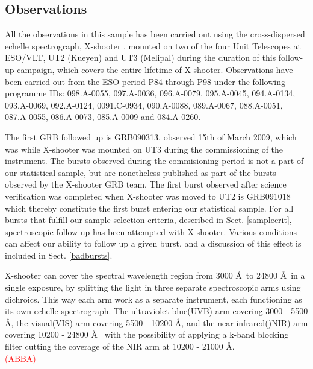 \documentclass{aa}    %
\newcommand\todo[1]{\textcolor{red}{(#1)}}
\begin{document}
\subsection{Observations} \label{obs}

All the observations in this sample has been carried out using the
cross-dispersed echelle spectrograph, X-shooter \citep{Vernet2011}, mounted on
two of the four Unit Telescopes at ESO/VLT, UT2 (Kueyen) and UT3 (Melipal)
during the duration of this follow-up campaign, which covers the entire lifetime
of X-shooter. Observations have been carried out from the ESO period P84
through P98 under the following programme IDs: 098.A-0055, 097.A-0036, 096.A-0079,
095.A-0045, 094.A-0134, 093.A-0069, 092.A-0124, 0091.C-0934, 090.A-0088,
089.A-0067, 088.A-0051, 087.A-0055, 086.A-0073, 085.A-0009 and 084.A-0260. 

The first GRB followed up is GRB090313, observed 15th of March 2009, which was
while X-shooter was mounted on UT3 during the commissioning of the instrument.
The bursts observed during the commisioning period is not a part of our
statistical sample, but are nonetheless published as part of the bursts observed
by the X-shooter GRB team. The first burst observed after science verification
was completed when X-shooter was moved to UT2 is GRB091018 which thereby
constitute the first burst entering our statistical sample. For all bursts that
fulfill our sample selection criteria, described in Sect. \ref{samplecrit},
spectroscopic follow-up has been attempted with X-shooter. Various conditions
can affect our ability to follow up a given burst, and a discussion of this
effect is included in Sect. \ref{badbursts}.

X-shooter can cover the spectral wavelength region from 3000 \AA~to 24800
\AA~in a single exposure, by splitting the light in three separate
spectroscopic arms using dichroics.  This way each arm work as a separate
instrument, each functioning as its own echelle spectrograph.  The ultraviolet
blue(UVB) arm covering 3000 - 5500 \AA, the visual(VIS) arm covering 5500 -
10200 \AA, and the near-infrared()NIR) arm covering 10200 - 24800 \AA~ with the
possibility of applying a k-band blocking filter cutting the coverage of the
NIR arm at 10200 - 21000 \AA.
\\

\todo{ABBA}
\end{document}
